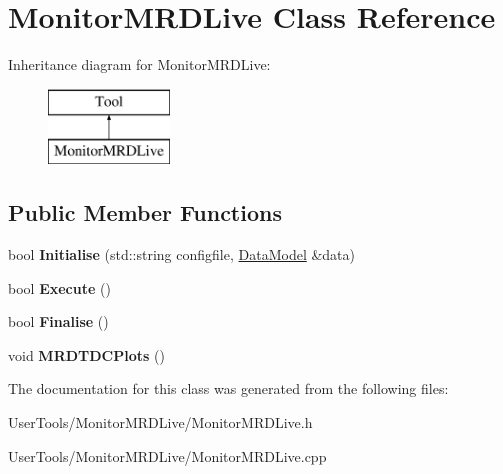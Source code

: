 \hypertarget{classMonitorMRDLive}{\section{Monitor\-M\-R\-D\-Live Class Reference}
\label{classMonitorMRDLive}
}
Inheritance diagram for Monitor\-M\-R\-D\-Live\-:\begin{figure}[H]
\begin{center}
\leavevmode
\includegraphics[height=2.000000cm]{classMonitorMRDLive}
\end{center}
\end{figure}
\subsection*{Public Member Functions}
\begin{DoxyCompactItemize}
\item 
\hypertarget{classMonitorMRDLive_a05a63a84f2a7b6e4340d21e2c018a971}{bool {\bfseries Initialise} (std\-::string configfile, \hyperlink{classDataModel}{Data\-Model} \&data)}\label{classMonitorMRDLive_a05a63a84f2a7b6e4340d21e2c018a971}

\item 
\hypertarget{classMonitorMRDLive_a86c7648cc8aad1fb24d86d7f13507128}{bool {\bfseries Execute} ()}\label{classMonitorMRDLive_a86c7648cc8aad1fb24d86d7f13507128}

\item 
\hypertarget{classMonitorMRDLive_ae061bd82e645e7cd1d383badee568d49}{bool {\bfseries Finalise} ()}\label{classMonitorMRDLive_ae061bd82e645e7cd1d383badee568d49}

\item 
\hypertarget{classMonitorMRDLive_a74930d4f7ddc5ff78db48551aa9d6f99}{void {\bfseries M\-R\-D\-T\-D\-C\-Plots} ()}\label{classMonitorMRDLive_a74930d4f7ddc5ff78db48551aa9d6f99}

\end{DoxyCompactItemize}


The documentation for this class was generated from the following files\-:\begin{DoxyCompactItemize}
\item 
User\-Tools/\-Monitor\-M\-R\-D\-Live/Monitor\-M\-R\-D\-Live.\-h\item 
User\-Tools/\-Monitor\-M\-R\-D\-Live/Monitor\-M\-R\-D\-Live.\-cpp\end{DoxyCompactItemize}
